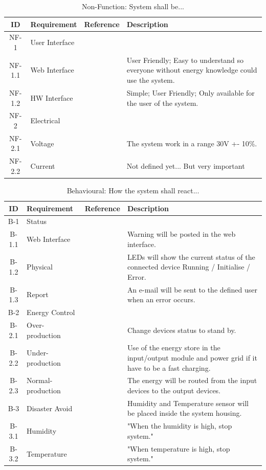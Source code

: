 		\begin{table}[h!]
			\begin{tabular} [b] {| c |  p{3cm} | c | p{10cm} |}
			\hline
			\textbf{ID} & \textbf{Requirement} & \textbf{Reference} & \textbf{Description} \\\hline
			NF-1 & User Interface &  &  \\ \hline
			NF-1.1 & Web Interface &  & User Friendly; Easy to understand so everyone without energy knowledge could use the system. \\ \hline
			NF-1.2 & HW Interface &  & Simple; User Friendly; Only available for the user of the system. \\ \hline
			NF-2 & Electrical &  &  \\ \hline
			NF-2.1 & Voltage &  & The system work in a range 30V +-  10\%.\\ \hline
			NF-2.2 & Current &  & Not defined yet... But very important \\ \hline
		\end{tabular}
		\caption{Non-Function: System shall be...}
		\end{table}
		\newpage
		\begin{table}[h!]
			\begin{tabular} [b] {| c |  p{3cm} | c | p{10cm} |}
			\hline
			\textbf{ID} & \textbf{Requirement} & \textbf{Reference} & \textbf{Description} \\\hline
			B-1 & Status &  &  \\\hline
			B-1.1 & Web Interface &  & Warning will be posted in the web interface. \\\hline
			B-1.2 & Physical &  & LEDs will show the current status of the connected device Running / Initialise / Error. \\\hline
			B-1.3 & Report &  & An e-mail will be sent to the defined user when an error occurs. \\\hline
			B-2 & Energy Control &  &  \\\hline
			B-2.1 & Over-production &  & Change devices status to stand by. \\\hline
			B-2.2 & Under-production &  & Use of the energy store in the input/output module and power grid if it have to be a fast charging. \\\hline
			B-2.3 & Normal-production &  & The energy will be routed from the input devices to the output devices. \\\hline
			B-3 & Disaster Avoid &  & Humidity and Temperature sensor will be placed inside the system housing. \\\hline
			B-3.1 & Humidity &  & "When the humidity is high, stop system." \\\hline
			B-3.2 & Temperature &  & "When temperature is high,  stop system." \\\hline
		\end{tabular}
		\caption{Behavioural: How the system shall react...}
		\end{table}
		
